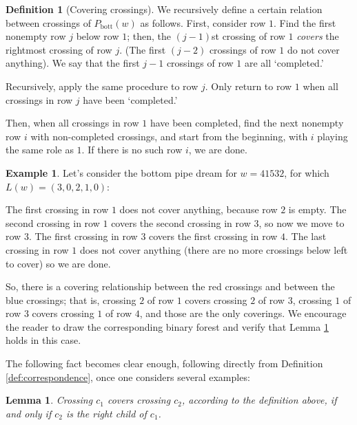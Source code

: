 \documentclass{article}
\newcommand{\cross}[2]{
\begin{scope}[xshift=#1cm,yshift=-#2cm]
\draw[very thick] (0,-0.5) -- (0.45,-0.5);
\draw[very thick] (0.55,-0.5) -- (1,-0.5);
    \draw[very thick] (0.5,0) -- (0.5,-1);
\end{scope}
}%
\newcommand{\arcs}[2]{
\begin{scope}[xshift=#1cm,yshift=-#2cm]
    \draw[very thick] (0,-0.5) arc (-90:0:0.5cm);
    \draw[very thick] (0.5,-1) arc (180:90:0.5cm);
\end{scope}
}%
\newcommand{\GRIDwitnum}[1]{
\begin{scope}
\foreach \n in {1,...,#1} \node at (\n-0.5,0.5){$\bm{\mathsf{\n}}$};
\foreach \n in {1,...,#1} \node at (-0.5,-\n+0.5){$\bm{\mathsf{\n}}$};
\draw[black!25!white] (0,-#1cm) |- (#1cm,0);
\foreach \n in {0,...,{#1}} \draw[black!25!white] (\n+1,0) -- (\n+1,\n-#1);
\foreach \n in {0,...,{#1}} \draw[black!25!white] (0,-\n-1) -- (#1-\n,-\n-1);
\foreach \n in {1,...,{#1}} \draw[very thick] (\n-1,-#1+\n-0.5) arc (-90:0:0.5cm);
\end{scope}
} %
\newtheorem{lemma}[theorem]{Lemma}
\theoremstyle{definition} %
\newtheorem{example}[theorem]{Example}
\newtheorem{definition}[theorem]{Definition}
\begin{document}
\begin{definition}[Covering crossings]\label{definition:matching}
   We recursively define a certain relation between crossings of $P_{\text{bott}}(w)$ as follows. First, consider row $1$. Find the first nonempty row $j$ below row $1$; then, the $(j-1)$st crossing of row $1$ \textit{covers} the rightmost crossing of row $j$. (The first $(j-2)$ crossings of row $1$ do not cover anything). We say that the first $j-1$ crossings of row $1$ are all `completed.'  

   Recursively, apply the same procedure to row $j$. Only return to row $1$ when all crossings in row $j$ have been `completed.' 
   
    Then, when all crossings in row $1$ have been completed, find the next nonempty row $i$ with non-completed crossings, and start from the beginning, with $i$ playing the same role as $1$. If there is no such row $i$, we are done. 
\end{definition}
\vspace{1em}

\begin{example}
    Let's consider the bottom pipe dream for $w = 41532$, for which $L(w) = (3, 0, 2, 1, 0)$: 

    \begin{center}
\end{center}

The first crossing in row $1$ does not cover anything, because row $2$ is empty. The second crossing in row $1$ covers the second crossing in row $3$, so now we move to row $3$. The first crossing in row $3$ covers the first crossing in row $4$. The last crossing in row $1$ does not cover anything (there are no more crossings below left to cover) so we are done. 

So, there is a covering relationship between the red crossings and between the blue crossings; that is, crossing $2$ of row $1$ covers crossing $2$ of row $3$, crossing $1$ of row $3$ covers crossing $1$ of row $4$, and those are the only coverings. We encourage the reader to draw the corresponding binary forest and verify that Lemma \ref{lemma:crossingmatching} holds in this case. 
\vspace{1em}

\end{example}
The following fact becomes clear enough, following directly from Definition \ref{def:correspondence}, once one considers several examples:
\vspace{1em}
\begin{lemma}\label{lemma:crossingmatching}
    Crossing $c_1$ covers crossing $c_2$, according to the definition above, if and only if $c_2$ is the right child of $c_1$. 
\end{lemma}
\end{document}
